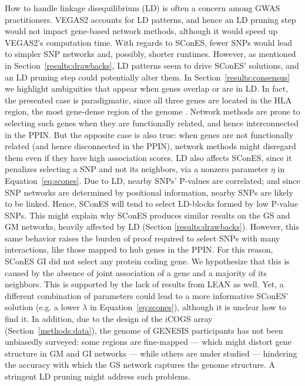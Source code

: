 \documentclass[10pt,letterpaper]{article}
\begin{document}
How to handle linkage disequilibrium (LD) is often a concern among GWAS practitioners. %
VEGAS2 accounts for LD patterns, and hence an LD pruning step would not impact gene-based network methods, although it would speed up VEGAS2's computation time. With regards to SConES, fewer SNPs would lead to simpler SNP networks and, possibly, shorter runtimes. However, as mentioned in Section~\ref{results:drawbacks}, LD patterns seem to drive SConES' solutions, and an LD pruning step could potentially alter them. In Section~\ref{results:consensus} we highlight ambiguities that appear when genes overlap or are in LD. In fact, the presented case is paradigmatic, since all three genes are located in the HLA region, the most gene-dense region of the genome \cite{Xie2003}. Network methods are prone to selecting such genes when they are functionally related, and hence interconnected in the PPIN. But the opposite case is also true: when genes are not functionally related (and hence disconnected in the PPIN), network methods might disregard them even if they have high association scores. LD also affects SConES, since it penalizes selecting a SNP and not its neighbors, via a nonzero parameter $\eta$ in Equation~\ref{eq:scones}. Due to LD, nearby SNPs' P-values are correlated; and since SNP networks are determined by positional information, nearby SNPs are likely to be linked. Hence, SConES will tend to select LD-blocks formed by low P-value SNPs. This might explain why SConES produces similar results on the GS and GM networks, heavily affected by LD (Section \ref{results:drawbacks}). However, this same behavior raises the burden of proof required to select SNPs with many interactions, like those mapped to hub genes in the PPIN. For this reason, SConES GI did not select any protein coding gene. We hypothesize that this is caused by the absence of joint association of a gene and a majority of its neighbors. This is supported by the lack of results from LEAN as well. Yet, a different combination of parameters could lead to a more informative SConES' solution (e.g. a lower \(\lambda\) in Equation~\ref{eq:scones}), although it is unclear how to find it. In addition, due to the design of the iCOGS array (Section~\ref{methods:data}), the genome of GENESIS participants has not been unbiasedly surveyed: some regions are fine-mapped --- which might distort gene structure in GM and GI networks --- while others are under studied --- hindering the accuracy with which the GS network captures the genome structure. A stringent LD pruning might address such problems. 
\end{document}
